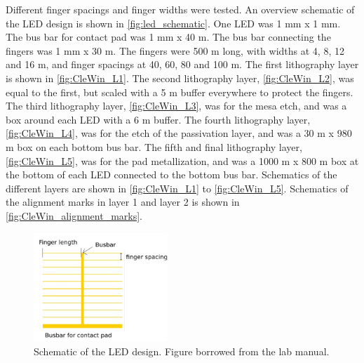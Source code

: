 Different finger spacings and finger widths were tested.
An overview schematic of the LED design is shown in \autoref{fig:led_schematic}.
One LED was 1 mm x 1 mm.
The bus bar for contact pad was 1 mm x 40 \textmu m.
The bus bar connecting the fingers was 1 mm x 30 \textmu m.
The fingers were 500 \textmu m long, with widths at 4, 8, 12 and 16 \textmu m, and finger spacings at 40, 60, 80 and 100 \textmu m.
The first lithography layer is shown in \autoref{fig:CleWin_L1}.
The second lithography layer, \autoref{fig:CleWin_L2}, was equal to the first, but scaled with a 5 \textmu m buffer everywhere to protect the fingers. 
The third lithography layer, \autoref{fig:CleWin_L3}, was for the mesa etch, and was a box around each LED with a 6 \textmu m buffer. 
The fourth lithography layer, \autoref{fig:CleWin_L4}, was for the etch of the passivation layer, and was a 30 \textmu m x 980 \textmu m box on each bottom bus bar. 
The fifth and final lithography layer, \autoref{fig:CleWin_L5}, was for the pad metallization, and was a 1000 \textmu m x 800 \textmu m box at the bottom of each LED connected to the bottom bus bar.
Schematics of the different layers are shown in \autoref{fig:CleWin_L1} to \autoref{fig:CleWin_L5}.
Schematics of the alignment marks in layer 1 and layer 2 is shown in \autoref{fig:CleWin_alignment_marks}.

\begin{figure}[ht]
    \centering
    \includegraphics[width=0.45\textwidth]{figures/LED_schematic.jpg}
    \caption{
        Schematic of the LED design.
        Figure borrowed from the lab manual.
    }
    \label{fig:led_schematic}
\end{figure}



